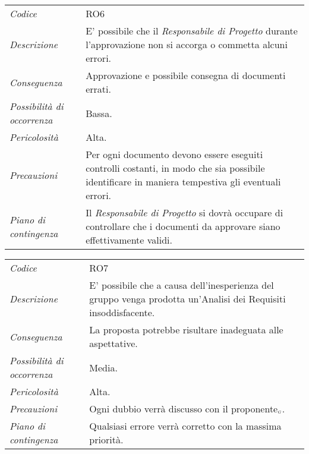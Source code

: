 {{{{{{{{{{	\begin{center}
		\renewcommand{\arraystretch}{1.4}
		\begin{longtable}{|p{5cm}|p{12cm}|}
			\hline
			\rowcolor{airforceblue}
			\multicolumn{2}{|c|}{\textit{Approvazione errata dei documenti}}\\
			\hline
			\textit{Codice} & RO6 \\
			\hline
			\textit{Descrizione} & E' possibile che il \textit{Responsabile di Progetto} durante l'approvazione non si accorga o commetta alcuni errori.\\
			\hline
			\textit{Conseguenza} & Approvazione e possibile consegna di documenti errati. \\
			\hline
			\textit{Possibilità di occorrenza} & Bassa. \\
			\hline
			\textit{Pericolosità} & Alta. \\
			\hline
			\textit{Precauzioni} & Per ogni documento devono essere eseguiti controlli costanti, in modo che sia possibile identificare in maniera tempestiva gli eventuali errori.  \\
			\hline
			\textit{Piano di contingenza} & Il \textit{Responsabile di Progetto} si dovrà occupare di controllare che i documenti da approvare siano effettivamente validi. \\
			\hline
		\end{longtable}
	\end{center}

\def\tabularxcolumn#1{m{#1}}
{
	
	\begin{center}
		\renewcommand{\arraystretch}{1.4}
		\begin{longtable}{|p{5cm}|p{12cm}|}
			\hline
			\rowcolor{airforceblue}
			\multicolumn{2}{|c|}{\textit{Analisi dei requisiti imperfetta}}\\
			\hline
			\textit{Codice} & RO7 \\
			\hline
			\textit{Descrizione} & E' possibile che a causa dell'inesperienza del gruppo venga prodotta un'Analisi dei Requisiti insoddisfacente.\\
			\hline
			\textit{Conseguenza} & La proposta potrebbe risultare inadeguata alle aspettative. \\
			\hline
			\textit{Possibilità di occorrenza} & Media. \\
			\hline
			\textit{Pericolosità} & Alta. \\
			\hline
			\textit{Precauzioni} & Ogni dubbio verrà discusso con il proponente$_{\scaleto{G}{3pt}}$.  \\
			\hline
			\textit{Piano di contingenza} & Qualsiasi errore verrà corretto con la massima priorità. \\
			\hline
		\end{longtable}
	\end{center}

}}}}}}}}}}}
